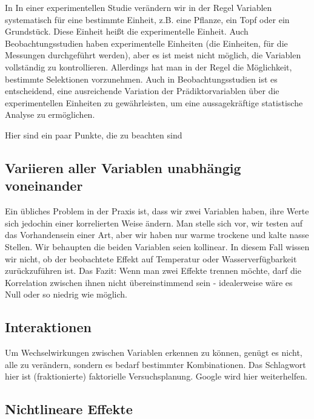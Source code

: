 \documentclass[a4paper,twoside]{tufte-book}\usepackage[]{graphicx}\usepackage[]{color}
\begin{document}
In In einer experimentellen Studie verändern wir in der Regel Variablen systematisch für eine bestimmte Einheit, z.B. eine Pflanze, ein Topf oder ein Grundstück. Diese Einheit heißt die experimentelle Einheit. Auch Beobachtungsstudien haben experimentelle Einheiten (die Einheiten, für die Messungen durchgeführt werden), aber es ist meist nicht möglich, die Variablen vollständig zu kontrollieren. Allerdings hat man in der Regel die Möglichkeit, bestimmte Selektionen vorzunehmen. Auch in Beobachtungsstudien ist es entscheidend, eine ausreichende Variation der Prädiktorvariablen über die experimentellen Einheiten zu gewährleisten, um eine aussagekräftige statistische Analyse zu ermöglichen.

Hier sind ein paar Punkte, die zu beachten sind

\subsection{Variieren aller Variablen unabhängig voneinander}

Ein übliches Problem in der Praxis ist, dass wir zwei Variablen haben, ihre Werte sich jedochin einer korrelierten Weise ändern. Man stelle sich vor, wir testen auf das Vorhandensein einer Art, aber wir haben nur warme trockene und kalte nasse Stellen. Wir behaupten die beiden Variablen seien kollinear. In diesem Fall wissen wir nicht, ob der beobachtete Effekt auf Temperatur oder Wasserverfügbarkeit zurückzuführen ist. Das Fazit: Wenn man zwei Effekte trennen möchte, darf die Korrelation zwischen ihnen nicht übereinstimmend sein - idealerweise wäre es Null oder so niedrig wie möglich. 

\subsection{Interaktionen}

Um Wechselwirkungen zwischen Variablen erkennen zu können, genügt es nicht, alle zu verändern, sondern es bedarf bestimmter Kombinationen. Das Schlagwort hier ist (fraktionierte) faktorielle Versuchsplanung. Google wird hier weiterhelfen.

\subsection{Nichtlineare Effekte}
\end{document}
